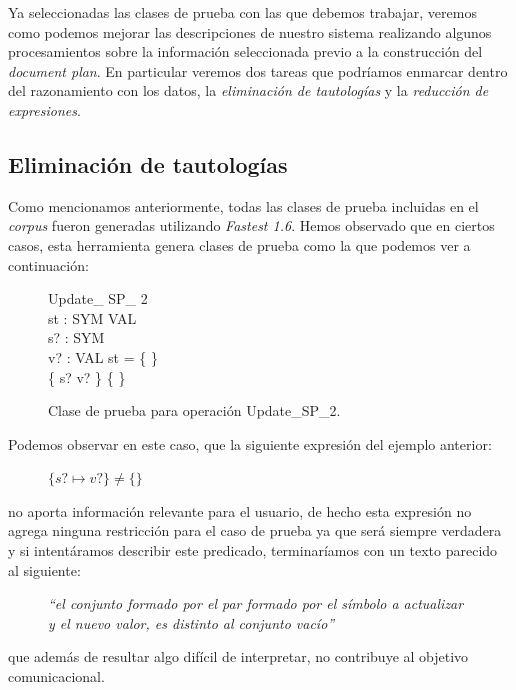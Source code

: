 Ya seleccionadas las clases de prueba con las que debemos trabajar, veremos como podemos mejorar las descripciones de nuestro sistema realizando algunos procesamientos sobre la información seleccionada previo a la construcción del \textit{document plan}. En particular veremos dos tareas que podríamos enmarcar dentro del razonamiento con los datos, la \emph{eliminación de tautologías} y la \emph{reducción de expresiones}. 

\subsection*{Eliminación de tautologías}
Como mencionamos anteriormente, todas las clases de prueba incluidas en el \emph{corpus} fueron generadas utilizando \emph{Fastest 1.6}. Hemos observado que en ciertos casos, esta herramienta genera clases de prueba como la que podemos ver a continuación:

\begin{figure}[H]
  \centering
\begin{schema}{Update\_ SP\_ 2}\\
 st : SYM \pfun VAL \\
 s? : SYM \\
 v? : VAL 
\where
 st = \{ \} \\
 \{ s? \mapsto v? \} \neq \{ \}
\end{schema}
  \caption{Clase de prueba para operación Update\_SP\_2.}
  \label{fig:ej_update_sp_2}
\end{figure}

Podemos observar en este caso, que la siguiente expresión del ejemplo anterior:

\begin{figure}[H]
  \centering
  $\{ s? \mapsto v? \} \neq \{ \}$ 
\end{figure}

\noindent
no aporta información relevante para el usuario, de hecho esta expresión no agrega ninguna restricción para el caso de prueba ya que será siempre verdadera y si intentáramos describir este predicado, terminaríamos con un texto parecido al siguiente:

\begin{figure}[H]
  \centering
  \emph{``el conjunto formado por el par formado por el símbolo a actualizar y el nuevo valor, es distinto al conjunto vacío''}
\end{figure}

\noindent
que además de resultar algo difícil de interpretar, no contribuye al objetivo comunicacional.

